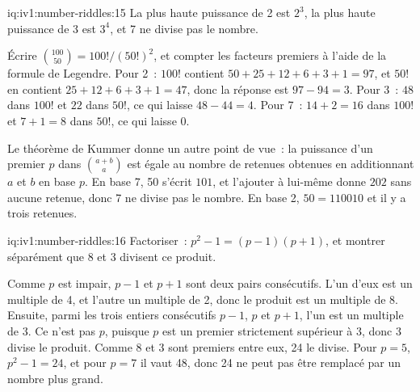 \begin{solution}{iq:iv1:number-riddles:15}
La plus haute puissance de 2 est $2^3$, la plus haute puissance de 3 est $3^4$, et 7 ne divise pas le nombre.

Écrire $\binom{100}{50} = 100! / (50!)^2$, et compter les facteurs premiers à l'aide de la formule de Legendre. Pour 2~: $100!$ contient $50 + 25 + 12 + 6 + 3 + 1 = 97$, et $50!$ en contient $25 + 12 + 6 + 3 + 1 = 47$, donc la réponse est $97 - 94 = 3$. Pour 3~: $48$ dans $100!$ et $22$ dans $50!$, ce qui laisse $48 - 44 = 4$. Pour 7~: $14 + 2 = 16$ dans $100!$ et $7 + 1 = 8$ dans $50!$, ce qui laisse 0.

Le théorème de Kummer donne un autre point de vue~: la puissance d'un premier $p$ dans $\binom{a + b}{a}$ est égale au nombre de retenues obtenues en additionnant $a$ et $b$ en base $p$. En base 7, 50 s'écrit $101$, et l'ajouter à lui-même donne $202$ sans aucune retenue, donc 7 ne divise pas le nombre. En base 2, $50 = 110010$ et il y a trois retenues.

\end{solution}

\enlargethispage{-3\baselineskip}%
\begin{solution}{iq:iv1:number-riddles:16}
Factoriser~: $p^2 - 1 = (p - 1)(p + 1)$, et montrer séparément que 8 et 3 divisent ce produit.

Comme $p$ est impair, $p - 1$ et $p + 1$ sont deux pairs consécutifs. L'un d'eux est un multiple de 4, et l'autre un multiple de 2, donc le produit est un multiple de 8. Ensuite, parmi les trois entiers consécutifs $p - 1$, $p$ et $p + 1$, l'un est un multiple de 3. Ce n'est pas $p$, puisque $p$ est un premier strictement supérieur à 3, donc 3 divise le produit. Comme 8 et 3 sont premiers entre eux, 24 le divise. Pour $p = 5$, $p^2 - 1 = 24$, et pour $p = 7$ il vaut 48, donc 24 ne peut pas être remplacé par un nombre plus grand.

\end{solution}

